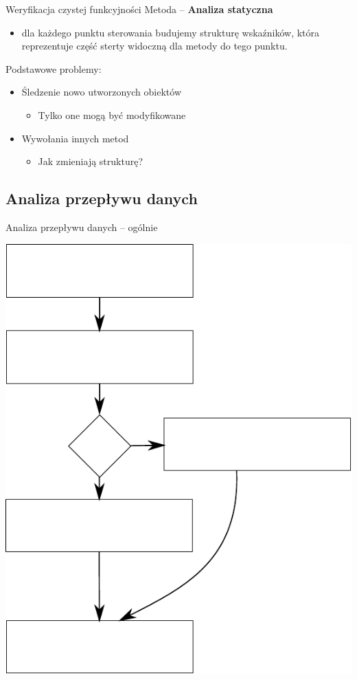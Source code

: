 \documentclass{beamer}
\begin{document}
\begin{frame}{Weryfikacja czystej funkcyjności}
  Metoda -- \textbf{Analiza statyczna}
  \begin{itemize}
    \item dla każdego punktu sterowania
    budujemy strukturę wskaźników, która reprezentuje część sterty
    widoczną dla metody do tego punktu.
  \end{itemize}
  \pause
  Podstawowe problemy:
  \begin{itemize}
  \item<2-> Śledzenie nowo utworzonych obiektów
    \begin{itemize}
    \item Tylko one mogą być modyfikowane
    \end{itemize}
  \item<3-> Wywołania innych metod
    \begin{itemize}
    \item Jak zmieniają strukturę?
    \end{itemize}
  \end{itemize}
  \pause
\end{frame}

\subsection{Analiza przepływu danych}

\begin{frame}{Analiza przepływu danych -- ogólnie}
\begin{center}
  \includegraphics[scale=0.55]{img/dataflow.pdf}  
\end{center}
\end{frame}
\end{document}
